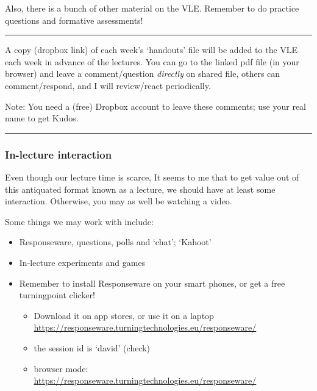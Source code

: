 \documentclass[]{article}
\providecommand{\tightlist}{%
  \setlength{\itemsep}{0pt}\setlength{\parskip}{0pt}}
\begin{document}
Also, there is a bunch of other material on the VLE. Remember to do practice questions and formative assessments!

\begin{center}\rule{0.5\linewidth}{\linethickness}\end{center}

A copy (dropbox link) of each week's `handouts' file will be added to the VLE each week in advance of the lectures. You can go to the linked pdf file (in your browser) and leave a comment/question \emph{directly} on shared file, others can comment/respond, and I will review/react periodically.

Note: You need a (free) Dropbox account to leave these comments; use your real name to get Kudos.

\begin{center}\rule{0.5\linewidth}{\linethickness}\end{center}

\hypertarget{in-lecture-interaction}{%
\subsubsection{In-lecture interaction}\label{in-lecture-interaction}}

Even though our lecture time is scarce, It seems to me that to get value out of this antiquated format known as a lecture, we should have at least some interaction. Otherwise, you may as well be watching a video.

Some things we may work with include:

\begin{itemize}
\item
  Responseware, questions, polls and `chat'; `Kahoot'
\item
  In-lecture experiments and games
\item
  Remember to install Responseware on your smart phones, or get a free turningpoint clicker!

  \begin{itemize}
  \tightlist
  \item
    Download it on app stores, or use it on a laptop \url{https://responseware.turningtechnologies.eu/responseware/}
  \item
    the session id is `david' (check)
  \item
    browser mode: \url{https://responseware.turningtechnologies.eu/responseware/}
  \end{itemize}
\end{itemize}
\end{document}

